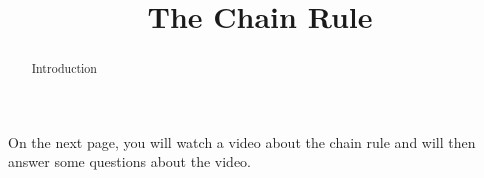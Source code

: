 \documentclass[handout]{ximera}
\title{The Chain Rule}
\begin{document}
\begin{abstract} Introduction %
\end{abstract}

\maketitle

On the next page, you will watch a video about the chain rule and will then answer some questions about the video.
\end{document}
